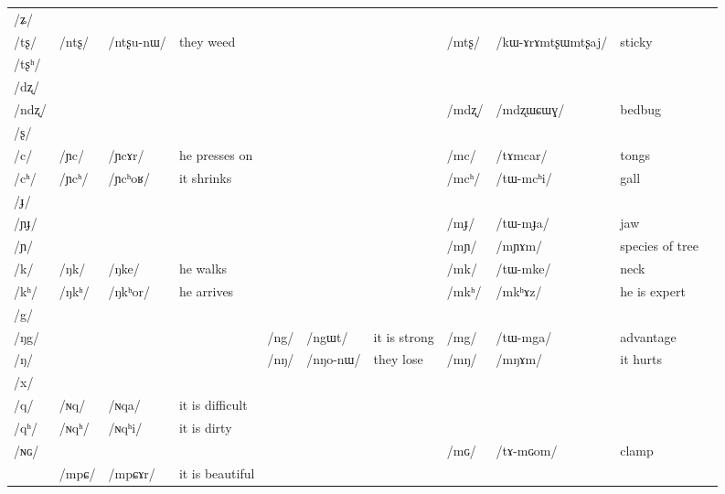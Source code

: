 \documentclass[oneside,a4paper,11pt]{article}
\newcommand{\ipa}[1]{\mbox{\phon/#1/}}
\newcommand{\deux}[1]{\ipa{#1}\addtocounter{2clusters}{1}}
\newcommand{\trois}[1]{\ipa{#1}\addtocounter{3clusters}{1}}
\newcommand{\resetcounters}[2]{
\newcounter{#1}
\newcounter{#2}
 \setcounter{#1}{\value{2clusters}}
  \setcounter{#2}{\value{3clusters}}
 \setcounter{2clusters}{0}
  \setcounter{3clusters}{0}
}
\begin{document}
\begin{table}
{\begin{tabular}{l|lll|lll|lll|l}
\ipa{ʑ} 	& 	& 	& 	& 	& 	& 	& 	& 	&  \\
\ipa{tʂ} 	& \deux{ntʂ} 	& \ipa{ntʂu-nɯ} 	& they weed 	& 	& 	& 	& \deux{mtʂ} 	& \ipa{kɯ-ɤrɤmtʂɯmtʂaj} 	& sticky \\
\ipa{tʂʰ} 	& 	& 	& 	& 	& 	& 	& 	& 	&  \\
\ipa{dʐ} 	& 	& 	& 	& 	& 	& 	& 	& 	&  \\
\ipa{ndʐ} 	& 	& 	& 	& 	& 	& 	& \deux{mdʐ} 	& \ipa{mdʐɯɕɯɣ} 	& bedbug \\
\ipa{ʂ} 	& 	& 	& 	& 	& 	& 	& 	& 	&  \\
\ipa{c} 	& \deux{ɲc} 	& \ipa{ɲcɤr} 	& he presses on	& 	& 	& 	& \deux{mc} 	& \ipa{tɤmcar} 	& tongs \\
\ipa{cʰ} 	& \deux{ɲcʰ} 	& \ipa{ɲcʰoʁ} 	& it shrinks	& 	& 	& 	& \deux{mcʰ} 	& \ipa{tɯ-mcʰi} 	& gall \\
\ipa{ɟ} 	& 	& 	& 	& 	& 	& 	& 	& 	&  \\
\ipa{ɲɟ} 	& 	& 	& 	& 	& 	& 	& \deux{mɟ} 	& \ipa{tɯ-mɟa} 	& jaw \\
\ipa{ɲ} 	& 	& 	& 	& 	& 	& 	& \deux{mɲ} 	& \ipa{mɲɤm} 	& species of tree \\
\ipa{k} 	& \deux{ŋk} 	& \ipa{ŋke} 	& he walks	& 	& 	& 	& \deux{mk} 	& \ipa{tɯ-mke} 	& neck \\
\ipa{kʰ} 	& \deux{ŋkʰ} 	& \ipa{ŋkʰor} 	&he arrives 	& 	& 	& 	& \deux{mkʰ} 	& \ipa{mkʰɤz} 	&he is expert  \\
\ipa{g} 	& 	& 	& 	& 	& 	& 	& 	& 	&  \\
\ipa{ŋg} 	& 	& 	& 	& \deux{ng} 	& \ipa{ngɯt} 	&it is strong 	& \deux{mg} 	& \ipa{tɯ-mga} 	& advantage \\
\ipa{ŋ} 	& 	& 	& 	& \deux{nŋ} 	& \ipa{nŋo-nɯ} 	& they lose	& \deux{mŋ} 	& \ipa{mŋɤm} 	& it hurts \\
\ipa{x} 	& 	& 	& 	& 	& 	& 	& 	& 	&  \\
\ipa{q} 	&   \deux{ɴq} 	& \ipa{ɴqa} 	& it is difficult	& 	&  	&	&	&	&\\
\ipa{qʰ}   	&   \deux{ɴqʰ} 	& \ipa{ɴqʰi} 	& it is dirty	& 	&	& 	& 	& 	&\\
\ipa{ɴɢ}  	& 	&	&	& 	& 	& 	& \deux{mɢ} 	& \ipa{tɤ-mɢom} 	&clamp  \\
\midrule
&\trois{mpɕ} &\ipa{mpɕɤr} & it is beautiful\\
\bottomrule
\end{tabular}}
\end{table} 
 \resetcounters{2nC}{3nC} %
 
  
  
\end{document}
